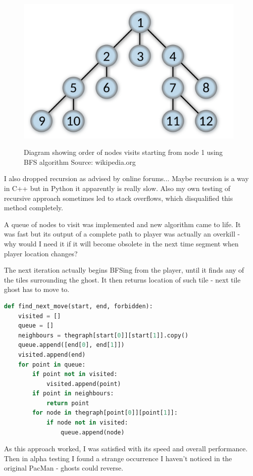 \documentclass[11pt,a4paper]{report}
\newenvironment{img}{
	\begin{center}
		\begin{figure}[H]
			\begin{center}
			
}{
	\end{center}
		\end{figure}
			\end{center}
}
\begin{document}
					\begin{img}
						\includegraphics[width=350pt]{images/bfs-diagram}\\
						\caption{Diagram showing order of nodes visits starting from node 1 using BFS algorithm Source: wikipedia.org}
					\end{img}
					
					I also dropped recursion as advised by online forums... Maybe recursion is a way in C++ but in Python it apparently is really slow. Also my own testing of recursive approach sometimes led to stack overflows, which disqualified this method completely.
					
					A queue of nodes to visit was implemented and new algorithm came to life. It was fast but its output of a complete path to player was actually an overkill - why would I need it if it will become obsolete in the next time segment when player location changes?
					
					The next iteration actually begins BFSing from the player, until it finds any of the tiles surrounding the ghost. It then returns location of such tile - next tile ghost has to move to.
					
					\begin{lstlisting}[language=Python]
def find_next_move(start, end, forbidden):
	visited = []
	queue = []
	neighbours = thegraph[start[0]][start[1]].copy()
	queue.append([end[0], end[1]])
	visited.append(end)
	for point in queue:
		if point not in visited:
			visited.append(point)
		if point in neighbours:
			return point
		for node in thegraph[point[0]][point[1]]:
			if node not in visited:
				queue.append(node)
					\end{lstlisting}
					
					As this approach worked, I was satisfied with its speed and overall performance. Then in alpha testing I found a strange occurrence I haven't noticed in the original PacMan - ghosts could reverse.
					
\end{document}
